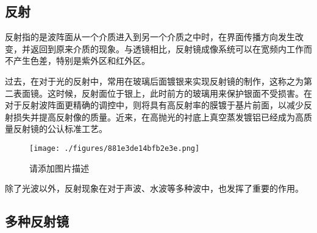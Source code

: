 \begin{issues}
\issueDraft
\issueMissDepend
\end{issues}

\subsection{反射}
反射指的是波阵面从一个介质进入到另一个介质之中时，在界面传播方向发生改变，并返回到原来介质的现象。与透镜相比，反射镜成像系统可以在宽频内工作而不产生色差，特别是紫外区和红外区。

过去，在对于光的反射中，常用在玻璃后面镀银来实现反射镜的制作，这称之为第二表面镜。这时候，反射面位于银上，此时前方的玻璃用来保护银面不受损害。在对于反射波阵面更精确的调控中，则将具有高反射率的膜镀于基片前面，以减少反射损失并提高反射像的质量。近来，在高抛光的衬底上真空蒸发镀铝已经成为高质量反射镜的公认标准工艺。
\begin{figure}[ht]
\centering
\texttt{[image: ./figures/881e3de14bfb2e3e.png]}
\caption{请添加图片描述} \label{fig_RefMir_2}
\end{figure}

除了光波以外，反射现象在对于声波、水波等多种波中，也发挥了重要的作用。
\subsection{多种反射镜}

